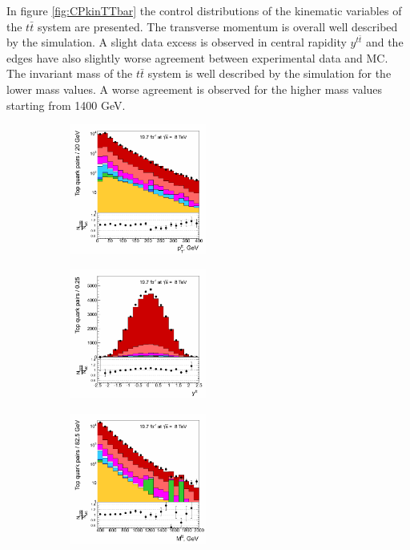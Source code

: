 In figure \ref{fig:CPkinTTbar} the control distributions of the kinematic variables of the $t\bar{t}$ system are presented. The transverse momentum is overall
well described by the simulation. A slight data excess is observed in central rapidity $y^{t\bar{t}}$ and the edges have also slightly worse agreement between
experimental data and MC. The invariant mass of the $t\bar{t}$ system is well described by the simulation for the lower mass values. A worse agreement is
observed for the higher mass values starting from 1400 GeV.

\begin{figure}[h]
\centering
\begin{subfigure}
  \centering
  \includegraphics[width=0.49\textwidth]{05_kinReco/plots/CP_ttbar_pt.png}
\end{subfigure}
\begin{subfigure}
  \centering
  \includegraphics[width=0.49\textwidth]{05_kinReco/plots/CP_ttbar_rapidity.png}
\end{subfigure}
\begin{subfigure}
  \centering
  \includegraphics[width=0.49\textwidth]{05_kinReco/plots/CP_ttbar_mass.png}

\end{subfigure}
\end{figure}
